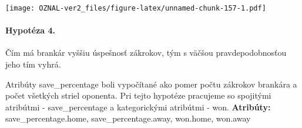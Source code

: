 \documentclass[
]{article}
\newenvironment{Shaded}{\begin{snugshade}}{\end{snugshade}}
\newcommand{\AttributeTok}[1]{\textcolor[rgb]{0.77,0.63,0.00}{#1}}
\newcommand{\ControlFlowTok}[1]{\textcolor[rgb]{0.13,0.29,0.53}{\textbf{#1}}}
\newcommand{\FunctionTok}[1]{\textcolor[rgb]{0.00,0.00,0.00}{#1}}
\newcommand{\NormalTok}[1]{#1}
\newcommand{\OtherTok}[1]{\textcolor[rgb]{0.56,0.35,0.01}{#1}}
\newcommand{\SpecialCharTok}[1]{\textcolor[rgb]{0.00,0.00,0.00}{#1}}
\newcommand{\StringTok}[1]{\textcolor[rgb]{0.31,0.60,0.02}{#1}}
\begin{document}
\begin{Shaded}
\end{Shaded}

\texttt{[image: OZNAL-ver2\_files/figure-latex/unnamed-chunk-157-1.pdf]}

\hypertarget{hypotuxe9za-4.}{%
\paragraph{Hypotéza 4.}\label{hypotuxe9za-4.}}

Čím má brankár vyššiu úspešnosť zákrokov, tým s väčšou pravdepodobnosťou
jeho tím vyhrá.

Atribúty save\_percentage boli vypočítané ako pomer počtu zákrokov
brankára a počet všetkých striel oponenta. Pri tejto hypotéze pracujeme
so spojitými atribútmi - save\_percentage a kategorickými atribútmi -
won. \textbf{Atribúty:} save\_percentage.home, save\_percentage.away,
won.home, won.away
\end{document}
